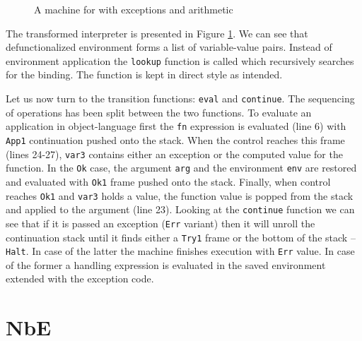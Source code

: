 \begin{figure}
  
  \caption{A machine for \LC{} with exceptions and arithmetic}
  \label{fig:studies-exceptions-machine}
\end{figure}

The transformed interpreter is presented in Figure \ref{fig:studies-exceptions-machine}.
We can see that defunctionalized environment forms a list of variable-value pairs.
Instead of environment application the \lstinline!lookup! function is called which recursively searches for the binding.
The function is kept in direct style as intended.

Let us now turn to the transition functions: \lstinline!eval! and \lstinline!continue!.
The sequencing of operations has been split between the two functions.
To evaluate an application in object-language first the \lstinline!fn! expression is evaluated (line 6) with \lstinline!App1! continuation pushed onto the stack.
When the control reaches this frame (lines 24-27), \lstinline!var3! contains either an exception or the computed value for the function.
In the \lstinline!Ok! case, the argument \lstinline!arg! and the environment \lstinline!env! are restored and evaluated with \lstinline!Ok1! frame pushed onto the stack.
Finally, when control reaches \lstinline!Ok1! and \lstinline!var3! holds a value, the function value is popped from the stack and applied to the argument (line 23).
Looking at the \lstinline!continue! function we can see that if it is passed an exception (\lstinline!Err! variant) then it will unroll the continuation stack until it finds either a \lstinline!Try1! frame or the bottom of the stack -- \lstinline!Halt!.
In case of the latter the machine finishes execution with \lstinline!Err! value.
In case of the former a handling expression is evaluated in the saved environment extended with the exception code. 

\section{NbE} %
